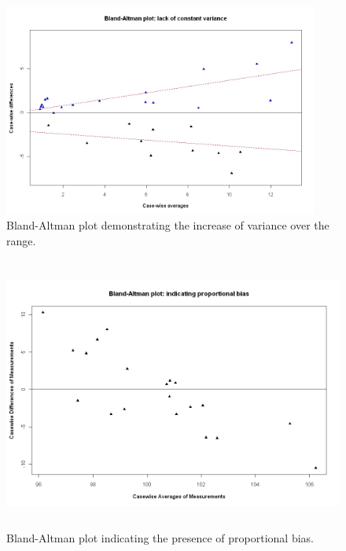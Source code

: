 \documentclass[compress]{beamer}        %
\begin{document}
\begin{frame}
\begin{figure}[h!]
\begin{center}
  \includegraphics[height=70mm]{BAFanEffect.jpeg}
  \caption{Bland-Altman plot demonstrating the increase of variance over the range.}\label{BAFanEffect}
\end{center}
\end{figure}

\begin{figure}[h!]
\begin{center}
  \includegraphics[height=90mm]{PropBias.jpeg}
  \caption{Bland-Altman plot indicating the presence of proportional bias.}\label{PropBias}
\end{center}
\end{figure}
\end{frame}
\end{document}
